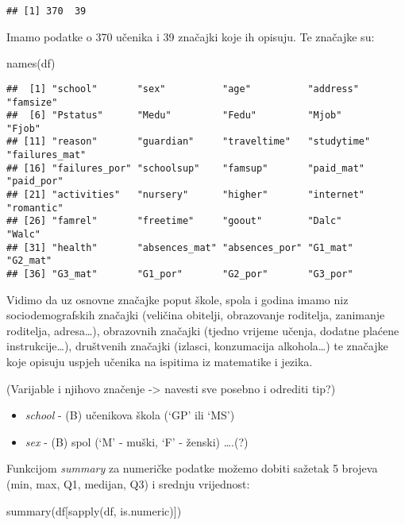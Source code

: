 \documentclass[
]{article}
\newenvironment{Shaded}{\begin{snugshade}}{\end{snugshade}}
\newcommand{\FunctionTok}[1]{\textcolor[rgb]{0.00,0.00,0.00}{#1}}
\newcommand{\NormalTok}[1]{#1}
\providecommand{\tightlist}{%
  \setlength{\itemsep}{0pt}\setlength{\parskip}{0pt}}
\begin{document}
\begin{verbatim}
## [1] 370  39
\end{verbatim}

Imamo podatke o 370 učenika i 39 značajki koje ih opisuju. Te značajke
su:

\begin{Shaded}
\begin{Highlighting}[]
\FunctionTok{names}\NormalTok{(df)}
\end{Highlighting}
\end{Shaded}

\begin{verbatim}
##  [1] "school"       "sex"          "age"          "address"      "famsize"     
##  [6] "Pstatus"      "Medu"         "Fedu"         "Mjob"         "Fjob"        
## [11] "reason"       "guardian"     "traveltime"   "studytime"    "failures_mat"
## [16] "failures_por" "schoolsup"    "famsup"       "paid_mat"     "paid_por"    
## [21] "activities"   "nursery"      "higher"       "internet"     "romantic"    
## [26] "famrel"       "freetime"     "goout"        "Dalc"         "Walc"        
## [31] "health"       "absences_mat" "absences_por" "G1_mat"       "G2_mat"      
## [36] "G3_mat"       "G1_por"       "G2_por"       "G3_por"
\end{verbatim}

Vidimo da uz osnovne značajke poput škole, spola i godina imamo niz
sociodemografskih značajki (veličina obitelji, obrazovanje roditelja,
zanimanje roditelja, adresa\ldots), obrazovnih značajki (tjedno vrijeme
učenja, dodatne plaćene instrukcije\ldots), društvenih značajki
(izlasci, konzumacija alkohola\ldots) te značajke koje opisuju uspjeh
učenika na ispitima iz matematike i jezika.

(Varijable i njihovo značenje -\textgreater{} navesti sve posebno i
odrediti tip?)

\begin{itemize}
\tightlist
\item
  \emph{school} - (B) učenikova škola (`GP' ili `MS')
\item
  \emph{sex} - (B) spol (`M' - muški, `F' - ženski) \ldots.(?)
\end{itemize}

Funkcijom \emph{summary} za numeričke podatke možemo dobiti sažetak 5
brojeva (min, max, Q1, medijan, Q3) i srednju vrijednost:

\begin{Shaded}
\begin{Highlighting}[]
\FunctionTok{summary}\NormalTok{(df[}\FunctionTok{sapply}\NormalTok{(df, is.numeric)])}
\end{Highlighting}
\end{Shaded}
\end{document}
